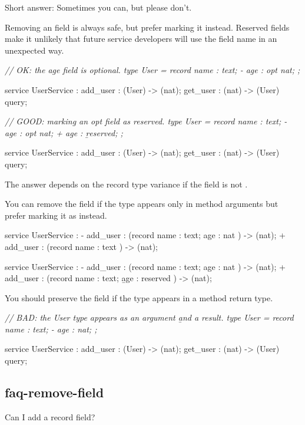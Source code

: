 \documentclass{article}
\begin{document}
Short answer: Sometimes you can, but please don't.

Removing an  field is always safe, but prefer marking it  instead.
Reserved fields make it unlikely that future service developers will use the field name in an unexpected way.

\begin{code}[good]
\em{// OK: the age field is optional.}
 type User = record {
   name : text;
-  age : opt nat;
 };

 service UserService : {
  add_user : (User) -> (nat);
  get_user : (nat) -> (User) query;
 }
\end{code}

\begin{code}[good]
\em{// GOOD: marking an opt field as reserved.}
 type User = record {
   name : text;
-  age : opt nat;
+  age : \b{reserved};
 };

 service UserService : {
  add_user : (User) -> (nat);
  get_user : (nat) -> (User) query;
 }
\end{code}

The answer depends on the record type variance if the field is not .

You can remove the field if the type appears only in method arguments but prefer marking it as  instead.

\begin{code}[good]
 service UserService : {
-  add_user : (record { name : text;  age : nat }) -> (nat);
+  add_user : (record { name : text             }) -> (nat);
 }
\end{code}

\begin{code}[good]
 service UserService : {
-  add_user : (record { name : text; age : nat      }) -> (nat);
+  add_user : (record { name : text; \b{age : reserved} }) -> (nat);
 }
\end{code}

You should preserve the field if the type appears in a method return type.

\begin{code}[bad]
\em{// BAD: the User type appears as an argument \b{and} a result.}
 type User = record {
   name : text;
-  age : nat;
};

 service UserService : {
  add_user : (User) -> (nat);
  get_user : (nat) -> (User) query;
 }
\end{code}

\subsection{faq-remove-field}{Can I add a record field?}
\end{document}
